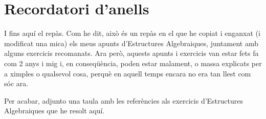 \documentclass[../../main.tex]{subfiles}
\begin{document}
\chapter{Recordatori d'anells}










I fins aquí el repàs. Com he dit, això és un repàs en el que he copiat i enganxat (i modificat una mica) els meus apunts d'Estructures Algebraiques, juntament amb alguns exercicis recomanats. Ara però, aquests apunts i exercicis van estar fets fa com 2 anys i mig i, en conseqüència, poden estar malament, o massa explicats per a ximples o qualsevol cosa, perquè en aquell temps encara no era tan llest com sóc ara.

Per acabar, adjunto una taula amb les referències als exercicis d'Estructures Algebraiques que he resolt aquí. 


\end{document}
